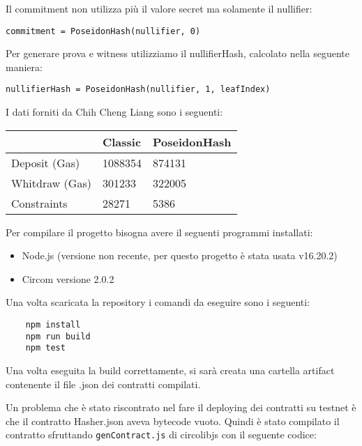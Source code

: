 Il commitment non utilizza più il valore secret ma solamente il nullifier:

\verb|commitment = PoseidonHash(nullifier, 0)|

Per generare prova e witness utilizziamo il nullifierHash, calcolato nella seguente maniera:

\verb|nullifierHash = PoseidonHash(nullifier, 1, leafIndex)|

I dati forniti da Chih Cheng Liang sono i seguenti:

\begin{table}[]
\begin{tabular}{|l|l|l|}
\hline
               & Classic & PoseidonHash \\ \hline
Deposit (Gas)  & 1088354 & 874131       \\ \hline
Whitdraw (Gas) & 301233  & 322005       \\ \hline
Constraints    & 28271   & 5386         \\ \hline
\end{tabular}
\end{table}

Per compilare il progetto bisogna avere il seguenti programmi installati:

\begin{itemize}
    \item Node.js (versione non recente, per questo progetto è stata usata v16.20.2)
    \item Circom versione 2.0.2
\end{itemize}

Una volta scaricata la repository i comandi da eseguire sono i seguenti:

\begin{verbatim}
    npm install
    npm run build
    npm test
\end{verbatim}

Una volta eseguita la build correttamente, si sarà creata una cartella artifact contenente il file .json dei contratti compilati.

Un problema che è stato riscontrato nel fare il deploying dei contratti su testnet è che il contratto Hasher.json aveva bytecode vuoto. Quindi è stato compilato il contratto sfruttando \verb|genContract.js| di circolibjs con il seguente codice:


